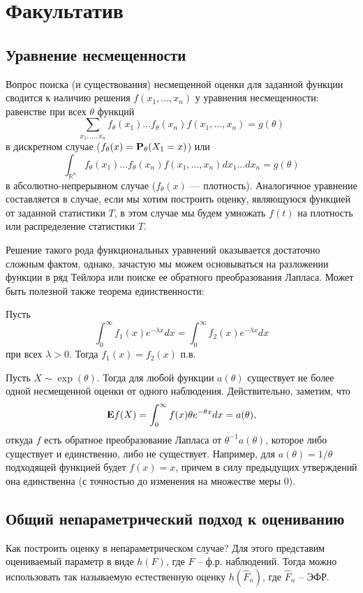 \documentclass[10 pt,russian]{report}
\begin{document}
\section{Факультатив}
\subsection{Уравнение несмещенности}
Вопрос поиска (и существования) несмещенной оценки для заданной функции сводится к наличию решения $f(x_1,...,x_n)$ у уравнения несмещенности: равенстве при всех $\theta$ функций
$$
\sum_{x_1,...,x_n} f_{\theta}(x_1)...f_{\theta}(x_n) f(x_1,...,x_n) = g(\theta)$$
в дискретном случае ($f_{\theta}(x) = {\bf P}_{\theta}(X_1=x)$) или
$$
\int_{\mathbb{R}^n} f_{\theta}(x_1)...f_{\theta}(x_n) f(x_1,...,x_n) dx_1 ... dx_n = g(\theta)
$$
в абсолютно-непрерывном случае ($f_{\theta}(x)$ --- плотность). Аналогичное уравнение составляется в случае, если мы хотим построить оценку, являющуюся функцией от заданной статистики $T$, в этом случае мы будем умножать $f(t)$ на плотность или распределение статистики $T$.

Решение такого рода функциональных уравнений оказывается достаточно сложным фактом, однако, зачастую мы можем основываться на разложении функции в ряд Тейлора или поиске ее обратного преобразования Лапласа. Может быть полезной также теорема единственности:
\begin{Th}
Пусть 
$$
\int_{0}^{\infty} f_1(x) e^{-\lambda x} dx = \int_0^{\infty} f_2(x) e^{-\lambda x} dx
$$
при всех $\lambda>0$. Тогда $f_1(x)=f_2(x)$ п.в.
\end{Th}
\Exam Пусть $X\sim \exp(\theta)$. Тогда для любой функции $a(\theta)$ существует не более одной несмещенной оценки от одного наблюдения. Действительно, заметим, что
$$
{\bf E}f(X) = \int_0^{\infty} f(x) \theta e^{-\theta x} dx = a(\theta), 
$$
откуда $f$ есть обратное преобразование Лапласа от $\theta^{-1} a(\theta)$, которое либо существует и единственно, либо не существует. Например, для $a(\theta)=1/\theta$ подходящей функцией будет $f(x)=x$, причем в силу предыдущих утверждений она единственна (с точностью до изменения на множестве меры 0).
\subsection{Общий непараметрический подход к оцениванию}
Как построить оценку в непараметрическом случае? Для этого представим оцениваемый параметр в виде $h(F)$, где $F$ -- ф.р. наблюдений. Тогда можно использовать так называемую естественную оценку $h(\widehat{F}_n)$, где $\widehat{F}_n$ -- ЭФР. 
\end{document}
